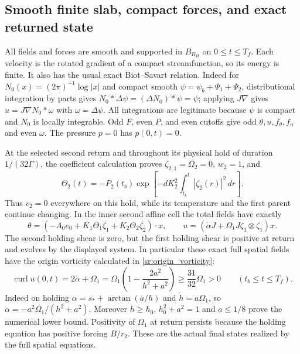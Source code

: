 \subsection{Smooth finite slab, compact forces, and exact returned state}

All fields and forces are smooth and supported in $B_{R_H}$ on
$0\leq t\leq T_f$. Each velocity is the rotated gradient of a
compact streamfunction, so its energy is finite. It also has the
usual exact Biot--Savart relation. Indeed for
$N_0(x)=(2\pi)^{-1}\log|x|$ and compact smooth
$\psi=\psi_b+\Psi_1+\Psi_2$, distributional integration by
parts gives $N_0*\Delta\psi=(\Delta N_0)*\psi=\psi$;
applying $J\nabla$ gives $u=J\nabla N_0*\omega$ with
$\omega=\Delta\psi$. All integrations are legitimate because
$\psi$ is compact and $N_0$ is locally integrable.
Odd $F$, even $P$, and even cutoffs give odd $\theta,u,f_\theta,f_u$
and even $\omega$. The pressure $p=0$ has $p(0,t)=0$.

At the selected second return and throughout its physical hold
of duration $1/(32\Gamma)$, the coefficient calculation proves
$\zeta_{2,1}=\Omega_2=0$, $w_2=1$, and
\[
 \Theta_2(t)=-P_2(t_b)
     \exp\left[-dK_2^2\int_{t_b}^t|\zeta_2(r)|^2\,dr\right].
\]
Thus $v_2=0$ everywhere on this hold, while its temperature and
the first parent continue changing. In the inner second affine
cell the total fields have exactly
\[
 \theta=\left(-A_0e_0+K_1\Theta_1\zeta_1
                          +K_2\Theta_2\zeta_2\right)\cdot x,
 \qquad
 u=\left(\dot\alpha J+\Omega_1J\zeta_1\otimes\zeta_1\right)x.
\]
The second holding shear is zero, but the first holding shear is
positive at return and evolves by the displayed system. In particular
these exact full spatial fields have the origin vorticity calculated
in \eqref{sr:origin_vorticity}:
\begin{equation}\label{ms:originvorticity}
 \operatorname{curl}u(0,t)=2\dot\alpha+\Omega_1
 =\Omega_1\left(1-\frac{2a^2}{h^2+a^2}\right)
 \geq\frac{31}{32}\Omega_1>0\qquad(t_b\leq t\leq T_f).
\end{equation}
Indeed on holding $\alpha=s_*+\arctan(a/h)$ and
$\dot h=a\Omega_1$, so $\dot\alpha=-a^2\Omega_1/(h^2+a^2)$.
Moreover $h\geq h_0$, $h_0^2+a^2=1$ and $a\leq1/8$ prove
the numerical lower bound. Positivity of $\Omega_1$ at return
persists because the holding equation has positive forcing $B/r_2$.
These are the actual final states realized by the full spatial equations.

